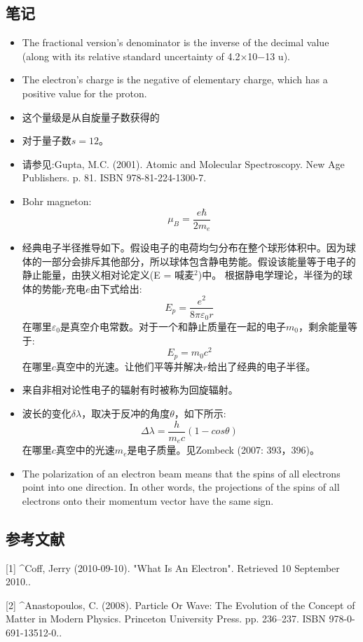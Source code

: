 \subsection{笔记}
\begin{itemize}
\item The fractional version's denominator is the inverse of the decimal value (along with its relative standard uncertainty of 4.2×10−13 u).
\item The electron's charge is the negative of elementary charge, which has a positive value for the proton.
\item 这个量级是从自旋量子数获得的
\item 对于量子数$s=12$。
\item 请参见:Gupta, M.C. (2001). Atomic and Molecular Spectroscopy. New Age Publishers. p. 81. ISBN 978-81-224-1300-7.
\item Bohr magneton:$$\mu_B=\frac{e\hbar}{2m_e}~$$
\item 经典电子半径推导如下。假设电子的电荷均匀分布在整个球形体积中。因为球体的一部分会排斥其他部分，所以球体包含静电势能。假设该能量等于电子的静止能量，由狭义相对论定义(E = 喊麦$^2$)中。
根据静电学理论，半径为的球体的势能$r$充电$e$由下式给出:$$E_p=\frac{e^2}{8\pi\varepsilon_0 r}~$$在哪里$\varepsilon_0$是真空介电常数。对于一个和静止质量在一起的电子$m_0$，剩余能量等于:$$E_p=m_0c^2~$$在哪里$c$真空中的光速。让他们平等并解决$r$给出了经典的电子半径。
\item 来自非相对论性电子的辐射有时被称为回旋辐射。
\item 波长的变化$\delta\lambda$，取决于反冲的角度$\theta$，如下所示:$$\Delta\lambda=\frac{h}{m_ec}(1-cos\theta)~$$在哪里$c$真空中的光速$m_e$是电子质量。见Zombeck (2007: 393，396)。
\item The polarization of an electron beam means that the spins of all electrons point into one direction. In other words, the projections of the spins of all electrons onto their momentum vector have the same sign.
\end{itemize}

\subsection{参考文献}
[1]
^Coff, Jerry (2010-09-10). "What Is An Electron". Retrieved 10 September 2010..

[2]
^Anastopoulos, C. (2008). Particle Or Wave: The Evolution of the Concept of Matter in Modern Physics. Princeton University Press. pp. 236–237. ISBN 978-0-691-13512-0..

